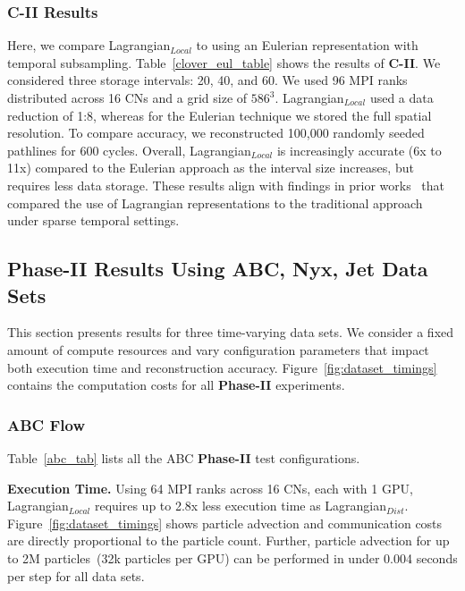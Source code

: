 \subsubsection{C-II Results} 

Here, we compare Lagrangian$_{Local}$ to using an Eulerian representation with temporal subsampling.
%
Table~\ref{clover_eul_table} shows the results of \textbf{C-II}.
%
We considered three storage intervals: 20, 40, and 60.
%
We used 96 MPI ranks distributed across 16 CNs and a grid size of $586^3$.
%
Lagrangian$_{Local}$ used a data reduction of 1:8, whereas for the Eulerian technique we stored the full spatial resolution.
%
To compare accuracy, we reconstructed 100,000 randomly seeded pathlines for 600 cycles.
%
%
Overall, Lagrangian$_{Local}$ is increasingly accurate (6x to 11x) compared to the Eulerian approach as the interval size increases, but requires less data storage.
%
These results align with findings in prior works~\cite{agranovsky2014improved, sane2018revisiting} that compared the use of Lagrangian representations to the traditional approach under sparse temporal settings.

\subsection{Phase-II Results Using ABC, Nyx, Jet Data Sets}
This section presents results for three time-varying data sets.
%
We consider a fixed amount of compute resources and vary configuration parameters that impact both execution time and reconstruction accuracy.
%
Figure~\ref{fig:dataset_timings} contains the computation costs for all \textbf{Phase-II} experiments.

\label{sec:experiment2}
\subsubsection{ABC Flow}
\label{sec:abc}

Table~\ref{abc_tab} lists all the ABC \textbf{Phase-II} test configurations.
%



\textbf{Execution Time.} Using 64 MPI ranks across 16 CNs, each with 1 GPU, Lagrangian$_{Local}$ requires up to 2.8x less execution time as Lagrangian$_{Dist}$.
%
Figure~\ref{fig:dataset_timings} shows particle advection and communication costs are directly proportional to the particle count.
%
Further, particle advection for up to 2M particles~(32k particles per GPU) can be performed in under 0.004 seconds per step for all data sets.
%


